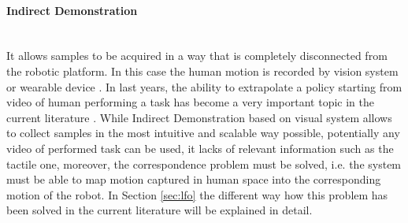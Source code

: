 \paragraph{Indirect Demonstration}  \mbox{} \\ 
It allows samples to be acquired in a way that is completely disconnected from the robotic platform. In this case the human motion is recorded by vision system \cite{} or wearable device \cite{}. In last years, the ability to extrapolate a policy starting from video of human performing a task has become a very important topic in the current literature \cite{fang2019survey,torabi2019recent_advances_lfo}. While Indirect Demonstration based on visual system allows to collect samples in the most intuitive and scalable way possible, potentially any video of performed task can be used, it lacks of relevant information such as the tactile one, moreover, the correspondence problem must be solved, i.e. the system must be able to map motion captured in human space into the corresponding motion of the robot. In Section \ref{sec:lfo} the different way how this problem has been solved in the current literature will be explained in detail. 
